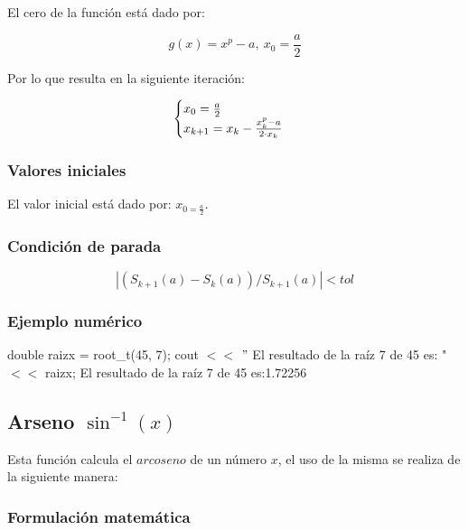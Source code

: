 \documentclass[10pt,a4paper]{article}
\begin{document}
	El cero de la función está dado por:
	
	\begin{equation}\label{key25}
		g(x) = x^{p} - a, ~x_{0} = \frac{a}{2}
	\end{equation}

	Por lo que resulta en la siguiente iteración:
	
	\begin{align*}
		\centering
		\begin{cases}
			x_{0} = \frac{a}{2} \\
			x_{k+1} = x_{k} - \frac{x_{k}^{p} - a}{2\cdot x_{k}}
		\end{cases}
	\end{align*}
	
	\subsubsection{Valores iniciales}
	El valor inicial está dado por: $x_{0 = \frac{a}{2}}$.
	\subsubsection{Condición de parada}
	\begin{equation}\label{key22}
		\left\lvert (S_{k+1}(a) - S_{k}(a)) / S_{k+1}(a) \right\lvert < tol
	\end{equation}
	\subsubsection{Ejemplo numérico}
	
	double raizx = root{\_}t(45, 7); \newline
	cout $<<$ $"$ El resultado de la raíz 7 de 45 es: " $<<$ raizx; \newline
	El resultado de la raíz 7 de 45 es:1.72256\newline
	
	\subsection{Arseno $\sin^{-1}(x)$}
	
	Esta función calcula el $arcoseno$ de un número $x$, el uso de la misma se realiza de la siguiente manera:
	
	\begin{center}
	\end{center}
	
	\subsubsection{Formulación matemática}
	
\end{document}
